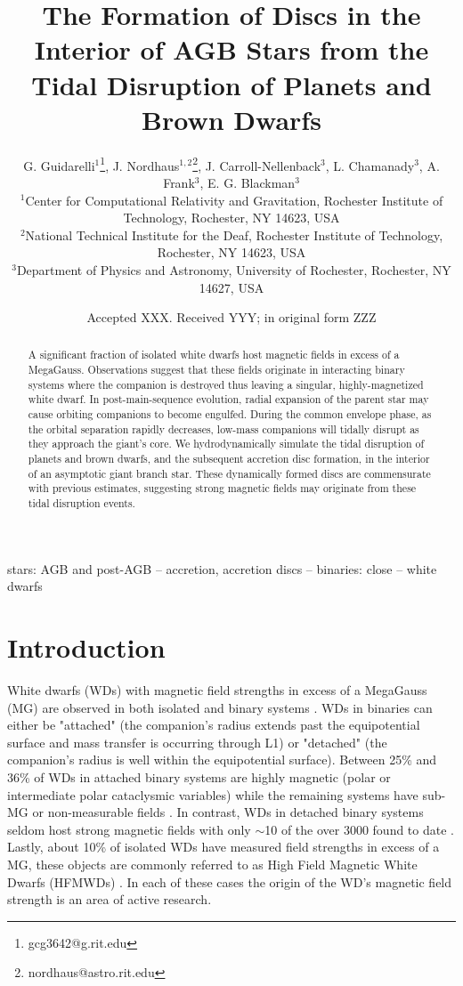 \documentclass[fleqn,usenatbib]{mnras}
\title[Tidal Disruption of Planets and BDs in AGB Stars]{The Formation of Discs in the Interior of AGB Stars from the Tidal Disruption of Planets and Brown Dwarfs}
\author[G. Guidarelli et al.]
{G. Guidarelli$^{1}$\thanks{gcg3642@g.rit.edu},
J. Nordhaus$^{1,2}$\thanks{nordhaus@astro.rit.edu},
J. Carroll-Nellenback$^{3}$,
L. Chamanady$^{3}$,
A. Frank$^{3}$,
\newauthor E. G. Blackman$^{3}$
\\
$^{1}$Center for Computational Relativity and Gravitation, Rochester Institute of Technology, Rochester, NY 14623, USA\\
$^{2}$National Technical Institute for the Deaf, Rochester Institute of Technology, Rochester, NY 14623, USA\\
$^{3}$Department of Physics and Astronomy, University of Rochester, Rochester, NY 14627, USA
}
\date{Accepted XXX. Received YYY; in original form ZZZ}
\begin{document}
\label{firstpage}
\pagerange{\pageref{firstpage}--\pageref{lastpage}}
\maketitle

\begin{abstract}
A significant fraction of isolated white dwarfs host magnetic fields in excess of a MegaGauss.  Observations suggest that these fields originate in interacting binary systems where the companion is destroyed thus leaving a singular, highly-magnetized white dwarf. In post-main-sequence evolution, radial expansion of the parent star may cause orbiting companions to become engulfed.  During the common envelope phase, as the orbital separation rapidly decreases, low-mass companions will tidally disrupt as they approach the giant's core.  We hydrodynamically simulate the tidal disruption of planets and brown dwarfs, and the subsequent accretion disc formation, in the interior of an asymptotic giant branch star. These dynamically formed discs are commensurate with previous estimates, suggesting strong magnetic fields may originate from these tidal disruption events.
\end{abstract}

\begin{keywords}
stars: AGB and post-AGB -- accretion, accretion discs -- binaries: close -- white dwarfs
\end{keywords}


\section{Introduction}

White dwarfs (WDs) with magnetic field strengths in excess of a MegaGauss (MG) are observed in both isolated and binary systems \citep{Ferrario2015}. WDs in binaries can either be "attached" (the companion's radius extends past the equipotential surface and mass transfer is occurring through L1) or "detached" (the companion's radius is well within the equipotential surface). Between 25\% and 36\%  of WDs in attached binary systems are highly magnetic (polar or intermediate polar cataclysmic variables) while the remaining systems have sub-MG or non-measurable fields \citep{Ferrario2015, Pala_2020}. In contrast, WDs in detached binary systems seldom host strong magnetic fields with only $\sim$10 of the over 3000 found to date \citep{Rebassa_2016, Parsons_2021}. Lastly, about 10\% of isolated WDs have measured field strengths in excess of a MG, these objects are commonly referred to as High Field Magnetic White Dwarfs (HFMWDs) \citep{Kawka_2007,Liebert_2003}. In each of these cases the origin of the WD's magnetic field strength is an area of active research.
\end{document}
